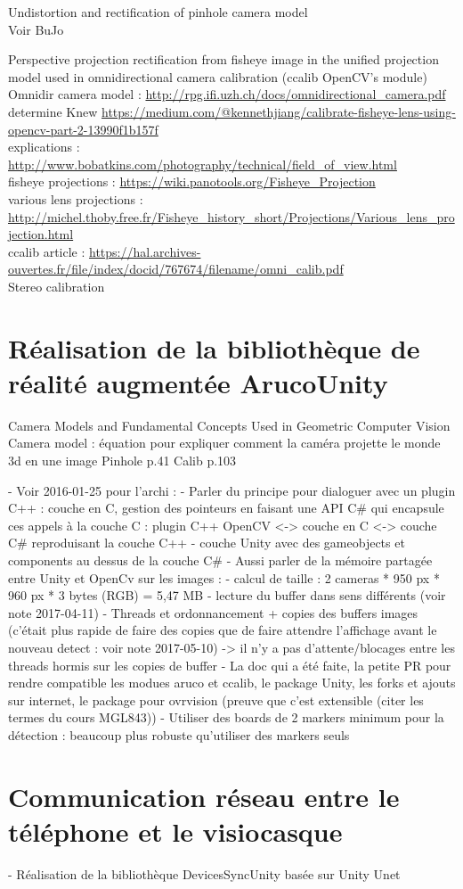 Undistortion and rectification of pinhole camera model\\
Voir BuJo

Perspective projection rectification from fisheye image in the unified projection model used in omnidirectional camera calibration (ccalib OpenCV's module)\\
Omnidir camera model : \url{http://rpg.ifi.uzh.ch/docs/omnidirectional_camera.pdf}\\
determine Knew \url{https://medium.com/@kennethjiang/calibrate-fisheye-lens-using-opencv-part-2-13990f1b157f}\\
explications : \url{http://www.bobatkins.com/photography/technical/field_of_view.html}\\
fisheye projections : \url{https://wiki.panotools.org/Fisheye_Projection}\\
various lens projections : \url{http://michel.thoby.free.fr/Fisheye_history_short/Projections/Various_lens_projection.html}\\
ccalib article : \url{https://hal.archives-ouvertes.fr/file/index/docid/767674/filename/omni_calib.pdf}\\

Stereo calibration


\section{Réalisation de la bibliothèque de réalité augmentée ArucoUnity}
Camera Models and Fundamental Concepts Used in Geometric Computer Vision
Camera model : équation pour expliquer comment la caméra projette le monde 3d en une image
Pinhole p.41
Calib p.103

- Voir 2016-01-25 pour l'archi :
  - Parler du principe pour dialoguer avec un plugin C++ : couche en C, gestion des pointeurs en faisant une API C\# qui encapsule ces appels à la couche C : plugin C++ OpenCV <-> couche en C <-> couche C\# reproduisant la couche C++ 
  - couche Unity avec des gameobjects et components au dessus de la couche C\#
- Aussi parler de la mémoire partagée entre Unity et OpenCv sur les images :
  - calcul de taille : 2 cameras * 950 px * 960 px * 3 bytes (RGB) = 5,47 MB
  - lecture du buffer dans sens différents (voir note 2017-04-11)
  - Threads et ordonnancement + copies des buffers images (c'était plus rapide de faire des copies que de faire attendre l'affichage avant le nouveau detect : voir note 2017-05-10) -> il n'y a pas d'attente/blocages entre les threads hormis sur les copies de buffer
- La doc qui a été faite, la petite PR pour rendre compatible les modues aruco et ccalib, le package Unity, les forks et ajouts sur internet, le package pour ovrvision (preuve que c'est extensible (citer les termes du cours MGL843))
- Utiliser des boards de 2 markers minimum pour la détection : beaucoup plus robuste qu'utiliser des markers seuls


\section{Communication réseau entre le téléphone et le visiocasque}
- Réalisation de la bibliothèque DevicesSyncUnity basée sur Unity Unet